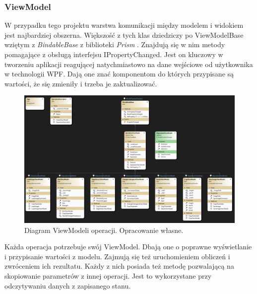 \subsubsection{ViewModel}

W przypadku tego projektu warstwa komunikacji między modelem i widokiem jest najbardziej obszerna. 
Większość z tych klas dziedziczy po ViewModelBase wziętym z \textit{BindableBase} \cite{prismlibraryprism} z biblioteki \textit{Prism} \cite{prismlibrary}. 
Znajdują się w nim metody pomagające z obsługą interfejsu IPropertyChanged. 
Jest on kluczowy w tworzeniu aplikacji reagującej natychmiastowo na dane wejściowe od użytkownika w technologii WPF. 
Dają one znać komponentom do których przypisane są wartości, że się zmieniły i trzeba je zaktualizować.

\begin{figure}[H]
    \centering
    \includegraphics[width=1\linewidth]{images/Picture20.png}
    \caption{Diagram ViewModeli operacji. Opracowanie własne.}
    \label{fig:vmDiagOperation}
\end{figure}

Każda operacja potrzebuje swój ViewModel. Dbają one o poprawne wyświetlanie i przypisanie wartości z modelu. Zajmują się też uruchomieniem obliczeń i zwróceniem ich rezultatu. Każdy z nich posiada też metodę pozwalającą na skopiowanie parametrów z innej operacji. Jest to wykorzystane przy odczytywaniu danych z zapisanego stanu.

